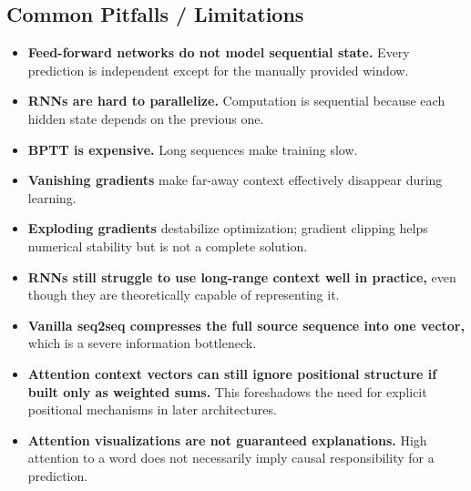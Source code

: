 \documentclass[11pt]{article}
\begin{document}
\subsection{Common Pitfalls / Limitations}
\begin{itemize}
    \item \textbf{Feed-forward networks do not model sequential state.} Every prediction is independent except for the manually provided window.
    \item \textbf{RNNs are hard to parallelize.} Computation is sequential because each hidden state depends on the previous one.
    \item \textbf{BPTT is expensive.} Long sequences make training slow.
    \item \textbf{Vanishing gradients} make far-away context effectively disappear during learning.
    \item \textbf{Exploding gradients} destabilize optimization; gradient clipping helps numerical stability but is not a complete solution.
    \item \textbf{RNNs still struggle to use long-range context well in practice,} even though they are theoretically capable of representing it.
    \item \textbf{Vanilla seq2seq compresses the full source sequence into one vector,} which is a severe information bottleneck.
    \item \textbf{Attention context vectors can still ignore positional structure if built only as weighted sums.} This foreshadows the need for explicit positional mechanisms in later architectures.
    \item \textbf{Attention visualizations are not guaranteed explanations.} High attention to a word does not necessarily imply causal responsibility for a prediction.
\end{itemize}
\end{document}
